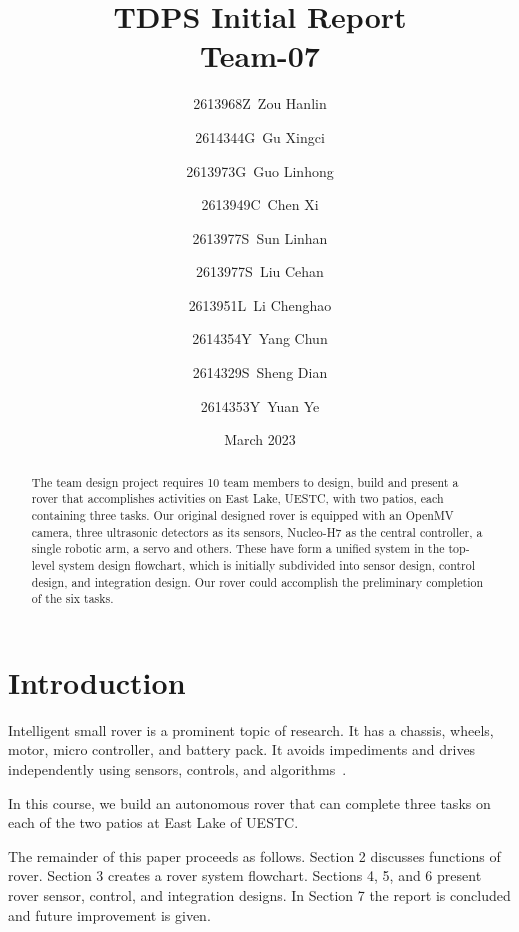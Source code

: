 \documentclass{article}
\title{TDPS Initial Report\\Team-07}
\author{
2613968Z\ Zou Hanlin\\
\and
2614344G\ Gu Xingci\\
\and
2613973G\ Guo Linhong\\
\and
2613949C\ Chen Xi\\
\and
2613977S\ Sun Linhan\\
\and
2613977S\ Liu Cehan\\
\and
2613951L\ Li Chenghao\\
\and
2614354Y\ Yang Chun\\
\and
2614329S\ Sheng Dian\\
\and
2614353Y\ Yuan Ye}
\date{March 2023}
\begin{document}
\maketitle
\begin{abstract}
The team design project requires 10 team members to design, build and present a rover that accomplishes activities on East Lake, UESTC, with two patios, each containing three tasks. Our original designed rover is equipped with an OpenMV camera, three ultrasonic detectors as its sensors, Nucleo-H7 as the central controller, a single robotic arm, a servo and others. These have form a unified system in the top-level system design flowchart, which is initially subdivided into sensor design, control design, and integration design. Our rover could accomplish the preliminary completion of the six tasks.
\end{abstract}
\newpage

\section{Introduction}
Intelligent small rover is a prominent topic of research. It has a chassis, wheels, motor, micro controller, and battery pack. It avoids impediments and drives independently using sensors, controls, and algorithms~\cite{92}.

In this course, we build an autonomous rover that can complete three tasks on each of the two patios at East Lake of UESTC.

The remainder of this paper proceeds as follows. Section 2 discusses functions of rover. Section 3 creates a rover system flowchart. Sections 4, 5, and 6 present rover sensor, control, and integration designs. In Section 7 the report is concluded and future improvement is given.
\end{document}
